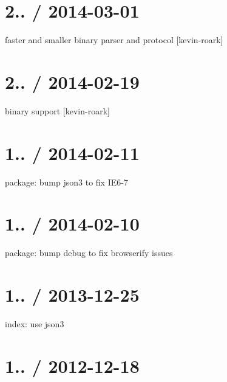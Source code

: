 \section*{2.. / 2014-\/03-\/01 }


\begin{DoxyItemize}
\item faster and smaller binary parser and protocol \mbox{[}kevin-\/roark\mbox{]}
\end{DoxyItemize}

\section*{2.. / 2014-\/02-\/19 }


\begin{DoxyItemize}
\item binary support \mbox{[}kevin-\/roark\mbox{]}
\end{DoxyItemize}

\section*{1.. / 2014-\/02-\/11 }


\begin{DoxyItemize}
\item package\+: bump {\ttfamily json3} to fix I\+E6-\/7
\end{DoxyItemize}

\section*{1.. / 2014-\/02-\/10 }


\begin{DoxyItemize}
\item package\+: bump debug to fix browserify issues
\end{DoxyItemize}

\section*{1.. / 2013-\/12-\/25 }


\begin{DoxyItemize}
\item index\+: use {\ttfamily json3}
\end{DoxyItemize}

\section*{1.. / 2012-\/12-\/18 }


